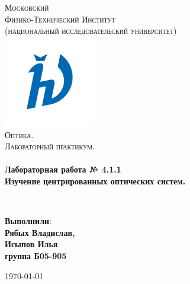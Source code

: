 \documentclass[a4paper,12pt]{article}
\begin{document}
\begin{titlepage}
	\begin{center}
		
		\textsc{\LARGE Московский\\[-0.2cm]Физико-Технический Институт\\[0.1cm]\large (национальный исследовательский университет)}\\[1.5cm] 
		
	\includegraphics[width=0.3\textwidth]{hv_s_no_bg.png}~\\[1cm]

	\textsc{\Large Оптика. \\ Лабораторный практикум. }\\[0.2cm]

	\HRule \\[0.4cm]
	{ \LARGE \bfseries Лабораторная работа № 4.1.1 \\ Изучение центрированных оптических систем. \\[0.4cm] }

	\HRule \\[1.5cm]
		
		\noindent
		\begin{minipage}{0.4\textwidth}
			\begin{flushleft} \large
			\end{flushleft}
		\end{minipage}%
		\begin{minipage}{0.4\textwidth}
			\begin{flushright} \large
			\end{flushright}
		\end{minipage}
		
		
		\large{\begin{flushright}
				\vfill
				\textbf{Выполнили}:\\
				\textbf{Рябых Владислав,\\}
				\textbf{Исыпов Илья\\}
				\textbf{группа Б05-905}
		\end{flushright}}
		
		
		{\large \today}\\
		
		
	\end{center}
\end{titlepage}
\end{document}
